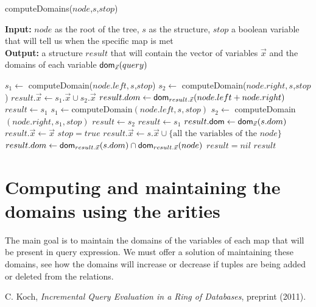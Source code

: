 \documentclass[12pt]{article}
\begin{document}
\begin{algorithm}[H]
\caption{computeDomains($node$,$s$,$stop$)} 
\label{alg2}
\textbf{Input:} $node$ as the root of the tree, $s$ as the structure, $stop$ a boolean variable that will tell us when the specific map is met\\
\textbf{Output:} a structure $result$ that will contain the vector of variables $\vec x$ and the domains of each variable $\textsf{dom}{}_{\vec x}(query)$
\begin{algorithmic}[1]
\STATE  $s_{1}\gets$ computeDomain($node.left, s$,$stop$)
\STATE  $s_{2}\gets$ computeDomain($node.right, s$,$stop$)
\STATE  $result.\vec{x}\gets s_{1}.\vec{x} \cup s_{2}.\vec{x}$ 
\STATE  $result.dom\gets \text{\textsf{dom}}_{result.\vec x}(node.left + node.right)$
\ELSE 
\STATE $result \gets s_{1}$
\ENDIF
{}
\STATE $s_{1} \gets \text{computeDomain}(node.left, s,stop)$
\STATE $s_{2}\gets$ computeDomain$(node.right, s_{1},stop)$
\STATE $result\gets s_{2}$
\ELSE
\STATE $result \gets s_{1}$
\ENDIF
{}
\STATE $result.\textsf{dom}{}\gets\text{\textsf{dom}}_{\vec{x}}(s.dom)$
\STATE $result.\vec{x}\gets \vec x$
\STATE $stop=true$
\ELSE 
\STATE $result.\vec{x}\gets s.\vec{x} \cup \{\text{all the variables of the $node$}\}$
\STATE $result.dom\gets \text{\textsf{dom}}_{result.\vec{x}}(s.dom)\cap\text{\textsf{dom}}_{result.\vec{x}}(node)$
\ENDIF
\ELSE
\STATE $result=nil$
\ENDIF
\RETURN $result$
\end{algorithmic}
\end{algorithm}

\section{Computing and maintaining the domains using the arities}

The main goal is to maintain the domains of the variables of each map that will be present in query expression. We must offer a solution of maintaining these domains, see how the domains will increase or decrease if tuples are being added or deleted from the relations.

\begin{thebibliography}{9}
 C. Koch, \emph{Incremental Query Evaluation in a Ring of Databases},  preprint (2011).
\end{thebibliography}
\end{document}
